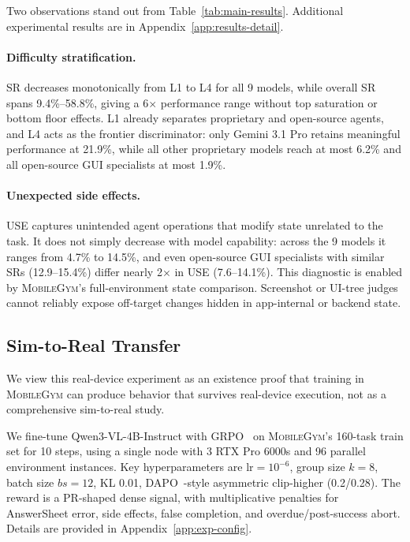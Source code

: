 \documentclass{llmxive}
\providecommand{\sys}{\textsc{MobileGym}}
\begin{document}
Two observations stand out from Table~\ref{tab:main-results}. Additional experimental results are in Appendix~\ref{app:results-detail}.

\paragraph{Difficulty stratification.} SR decreases monotonically from L1 to L4 for all 9 models, while overall SR spans 9.4\%--58.8\%, giving a 6$\times$ performance range without top saturation or bottom floor effects. L1 already separates proprietary and open-source agents, and L4 acts as the frontier discriminator: only Gemini 3.1 Pro retains meaningful performance at 21.9\%, while all other proprietary models reach at most 6.2\% and all open-source GUI specialists at most 1.9\%.

\paragraph{Unexpected side effects.} USE captures unintended agent operations that modify state unrelated to the task. It does not simply decrease with model capability: across the 9 models it ranges from 4.7\% to 14.5\%, and even open-source GUI specialists with similar SRs (12.9--15.4\%) differ nearly 2$\times$ in USE (7.6--14.1\%). This diagnostic is enabled by \sys{}'s full-environment state comparison. Screenshot or UI-tree judges cannot reliably expose off-target changes hidden in app-internal or backend state.

\subsection{Sim-to-Real Transfer}\label{sec:exp:sim2real}

We view this real-device experiment as an existence proof that
training in \sys{} can produce behavior that survives real-device
execution, not as a comprehensive sim-to-real study.

We fine-tune Qwen3-VL-4B-Instruct with GRPO~\cite{GRPO} on \sys{}'s 160-task train set for 10 steps, using a single node with 3 RTX Pro 6000s and 96 parallel environment instances. Key hyperparameters are $\mathrm{lr}=10^{-6}$, group size $k{=}8$, batch size $bs{=}12$, KL 0.01, DAPO~\cite{DAPO}-style asymmetric clip-higher (0.2/0.28). The reward is a PR-shaped dense signal, with multiplicative penalties for AnswerSheet error, side effects, false completion, and overdue/post-success abort. Details are provided in Appendix~\ref{app:exp-config}.
\end{document}
